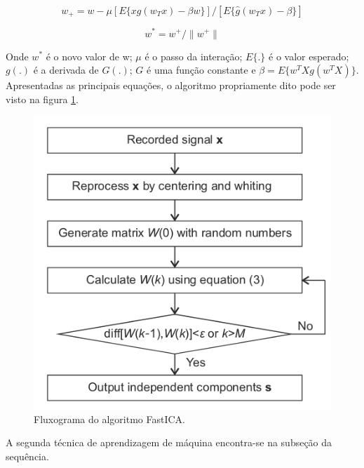 \begin{equation}\label{eq:ica_3}
    w_+ = w - \mu[E\{xg(w_Tx)-\beta w\}] /[E\{\hat{g}(w_Tx)-\beta\}]
\end{equation}

\begin{equation}\label{eq:ica_4}
    w^* = w^+/\parallel w^+\parallel
\end{equation}

Onde $w^*$ é o novo valor de w; $\mu$ é o passo da interação; $E\{.\}$ é o valor esperado; $g(.)$ é a derivada de $G(.)$; $G$ é uma
função constante e $\beta = E\{w^T Xg(w^T X)\}$.
Apresentadas as principais equações, o algoritmo propriamente dito pode ser visto na figura \ref{fig:fatica_fang_p3}.

\begin{figure}[H]
    \caption{Fluxograma do algoritmo FastICA.}
    \begin{center}
        \includegraphics[scale=.5]{referencial/img/fatica_fang_p3.png}
    \end{center}
    \label{fig:fatica_fang_p3}
\end{figure}

A segunda técnica de aprendizagem de máquina encontra-se na subseção da sequência.


% 

